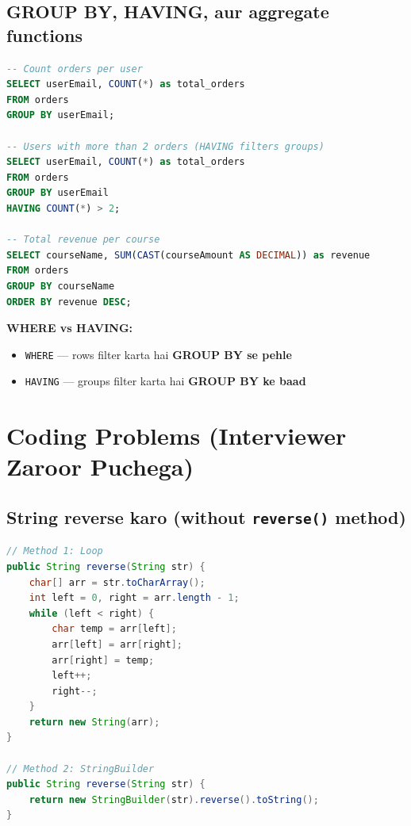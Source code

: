 \documentclass[12pt,a4paper]{article}
\begin{document}
\subsection{GROUP BY, HAVING, aur aggregate functions}

\begin{answerbox}
\begin{lstlisting}[language=SQL]
-- Count orders per user
SELECT userEmail, COUNT(*) as total_orders 
FROM orders 
GROUP BY userEmail;

-- Users with more than 2 orders (HAVING filters groups)
SELECT userEmail, COUNT(*) as total_orders 
FROM orders 
GROUP BY userEmail 
HAVING COUNT(*) > 2;

-- Total revenue per course
SELECT courseName, SUM(CAST(courseAmount AS DECIMAL)) as revenue 
FROM orders 
GROUP BY courseName 
ORDER BY revenue DESC;
\end{lstlisting}
\textbf{WHERE vs HAVING:}
\begin{itemize}
    \item \texttt{WHERE} --- rows filter karta hai \textbf{GROUP BY se pehle}
    \item \texttt{HAVING} --- groups filter karta hai \textbf{GROUP BY ke baad}
\end{itemize}
\end{answerbox}

\section{Coding Problems (Interviewer Zaroor Puchega)}

\setcounter{subsection}{76}

\subsection{String reverse karo (without \texttt{reverse()} method)}

\begin{answerbox}
\begin{lstlisting}[language=Java]
// Method 1: Loop
public String reverse(String str) {
    char[] arr = str.toCharArray();
    int left = 0, right = arr.length - 1;
    while (left < right) {
        char temp = arr[left];
        arr[left] = arr[right];
        arr[right] = temp;
        left++;
        right--;
    }
    return new String(arr);
}

// Method 2: StringBuilder
public String reverse(String str) {
    return new StringBuilder(str).reverse().toString();
}
\end{lstlisting}
\end{answerbox}
\end{document}

